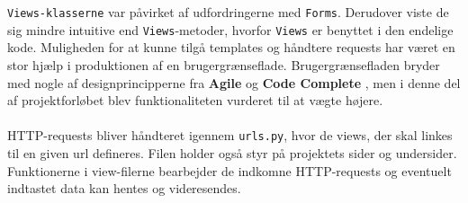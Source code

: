 \documentclass[]{article}
\begin{document}
\texttt{Views-klasserne} var påvirket af udfordringerne med \texttt{Forms}. Derudover viste de sig mindre intuitive end \texttt{Views}-metoder, hvorfor \texttt{Views} er benyttet i den endelige kode. Muligheden for at kunne tilgå templates og håndtere requests har været en stor hjælp i produktionen af en brugergrænseflade. Brugergrænsefladen bryder med nogle af designprincipperne fra \textbf{Agile} \cite{martin2006agile} og \textbf{Code Complete} \cite{mcconnell2004code}, men i denne del af projektforløbet blev funktionaliteten vurderet til at vægte højere. \\ \\
HTTP-requests bliver håndteret igennem \texttt{urls.py}, hvor de views, der skal linkes til en given url defineres. Filen holder også styr på projektets sider og undersider. Funktionerne i view-filerne bearbejder de indkomne HTTP-requests og eventuelt indtastet data kan hentes og videresendes.
\end{document}
